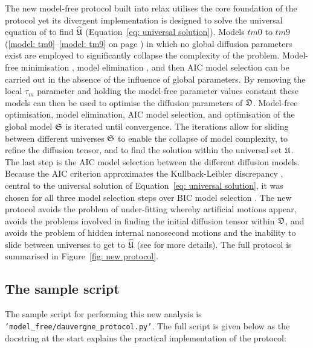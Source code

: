 \begin{htmlonly}
\begin{htmlonly}
The new model-free protocol built into relax utilises the core foundation of the \citet{Butterwick04} protocol yet its divergent implementation is designed to solve the universal equation of \citet{dAuvergneGooley07} to find $\widehat{\mathfrak{U}}$ (Equation~\ref{eq: universal solution}).  Models $tm0$ to $tm9$ (\ref{model: tm0}--\ref{model: tm9} on page \pageref{model: tm0}) in which no global diffusion parameters exist are employed to significantly collapse the complexity of the problem.  Model-free minimisation \citep{dAuvergneGooley08a}, model elimination \citep{dAuvergneGooley06}, and then AIC model selection \citep{Akaike73, dAuvergneGooley03} can be carried out in the absence of the influence of global parameters.  By removing the local $\tau_m$ parameter and holding the model-free parameter values constant these models can then be used to optimise the diffusion parameters of $\mathfrak{D}$.  Model-free optimisation, model elimination, AIC model selection, and optimisation of the global model $\mathfrak{S}$ is iterated until convergence.  The iterations allow for sliding between different universes $\mathfrak{S}$ to enable the collapse of model complexity, to refine the diffusion tensor, and to find the solution within the universal set $\mathfrak{U}$.  The last step is the AIC model selection between the different diffusion models.  Because the AIC criterion approximates the Kullback-Leibler discrepancy \citep{KullbackLeibler51}, central to the universal solution of Equation~\eqref{eq: universal solution}, it was chosen for all three model selection steps over BIC model selection \citep{Schwarz78, dAuvergneGooley03, Chen04}.  The new protocol avoids the problem of under-fitting whereby artificial motions appear, avoids the problems involved in finding the initial diffusion tensor within $\mathfrak{D}$, and avoids the problem of hidden internal nanosecond motions and the inability to slide between universes to get to $\widehat{\mathfrak{U}}$ (see \citet{dAuvergneGooley07} for more details).  The full protocol is summarised in Figure~\ref{fig: new protocol}.




\subsection{The sample script}

The sample script for performing this new analysis is \texttt{`model\_free/dauvergne\_protocol.py'}.  The full script is given below as the docstring at the start explains the practical implementation of the protocol:


\end{htmlonly}
\end{htmlonly}
